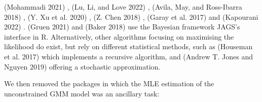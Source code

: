 \begin{itemize}
  (Mohammadi 2021) ,  (Lu, Li, and Love 2022) ,  (Avila, May, and Ross-Ibarra 2018)
  ,  (Y. Xu et al. 2020) , 
  (Z. Chen 2018) ,  (Garay et al. 2017) and
   (Kapourani 2022) .  (Gruen 2021) and
   (Baker 2018) use the Bayesian
  framework JAGS's interface in R. Alternatively, other algorithms
  focusing on maximising the likelihood do exist, but rely on
  different statistical methods, such as  (Houseman et al. 2017)
  which implements a recursive algorithm, and 
  (Andrew T. Jones and Nguyen 2019) offering a stochastic approximation.
\end{itemize}

We then removed the packages in which the MLE estimation of the
unconstrained GMM model was an ancillary task:

